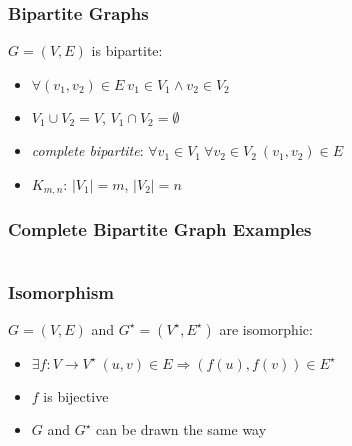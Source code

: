 \documentclass[dvipsnames]{beamer}
\begin{document}
\begin{frame}
  \frametitle{Bipartite Graphs}

  \begin{definition}
    $G=(V,E)$ is \alert{bipartite}:
    \begin{itemize}
      \item $\forall (v_1,v_2) \in E~v_1 \in V_1 \wedge v_2 \in V_2$
      \item $V_1 \cup V_2 = V$, $V_1 \cap V_2 = \emptyset$
    \end{itemize}
  \end{definition}

  \pause
  \begin{itemize}
    \item \emph{complete bipartite}:
      $\forall v_1 \in V_1~\forall v_2 \in V_2~(v_1,v_2) \in E$
    \item $K_{m,n}$: $|V_1|=m$, $|V_2|=n$
  \end{itemize}
\end{frame}

\begin{frame}
  \frametitle{Complete Bipartite Graph Examples}

  \begin{columns}[t]
    \begin{example}[$K_{2,3}$]
      \begin{center}
      \end{center}
    \end{example}

    \begin{example}[$K_{3,3}$]
      \begin{center}
      \end{center}
    \end{example}
  \end{columns}
\end{frame}

\begin{frame}
  \frametitle{Isomorphism}

  \begin{definition}
    $G=(V,E)$ and $G^\star=(V^\star,E^\star)$ are \alert{isomorphic}:
    \begin{itemize}
      \item $\exists f: V \rightarrow V^\star~(u,v) \in E \Rightarrow (f(u),f(v)) \in E^\star$
      \item $f$ is bijective
    \end{itemize}
  \end{definition}

  \pause
  \begin{itemize}
    \item $G$ and $G^\star$ can be drawn the same way
  \end{itemize}
\end{frame}
\end{document}
